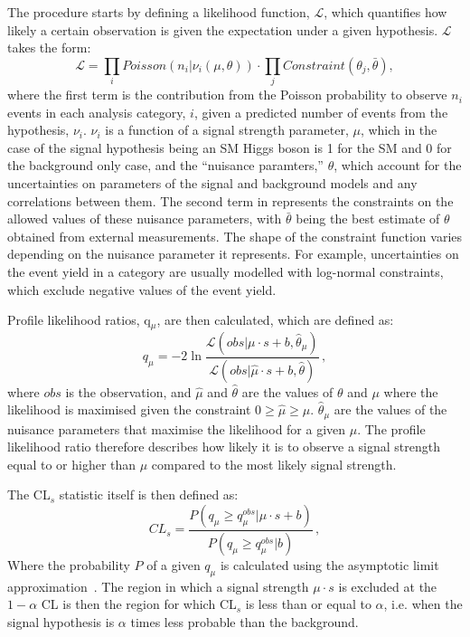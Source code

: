 The procedure starts by defining a likelihood function, $\mathcal{L}$, which quantifies how likely a certain observation is given the expectation under a given hypothesis. $\mathcal{L}$ takes the form:
\begin{equation}
  \label{eq:likelihood}
  \mathcal{L}=\displaystyle\prod_{i}Poisson\left(n_{i}|\nu_{i}\left(\mu,\theta\right)\right)\cdot\prod_{j}Constraint\left(\theta_{j},\bar{\theta}\right),
\end{equation}
where the first term is the contribution from the Poisson probability to observe $n_{i}$ events in each analysis category, $i$, given a predicted number of events from the hypothesis, $\nu_{i}$. $\nu_{i}$ is a function of a signal strength parameter, $\mu$, which in the case of the signal hypothesis being an SM Higgs boson is 1 for the SM and 0 for the background only case, and the ``nuisance paramters,'' $\theta$, which account for the uncertainties on parameters of the signal and background models and any correlations between them. The second term in  represents the constraints on the allowed values of these nuisance parameters, with $\bar{\theta}$ being the best estimate of $\theta$ obtained from external measurements. The shape of the constraint function varies depending on the nuisance parameter it represents. For example, uncertainties on the event yield in a category are usually modelled with log-normal constraints, which exclude negative values of the event yield. 

Profile likelihood ratios, q$_{\mu}$, are then calculated, which are defined as:
\begin{equation}
  \label{eq:proflikelihood}
  q_{\mu} = -2 \ln\frac{\mathcal{L}(obs|\mu \cdot s + b,\hat{\theta}_{\mu})}{\mathcal{L}(obs|\hat{\mu} \cdot s + b,\hat{\theta})}\,,
\end{equation}
where $obs$ is the observation, and $\hat{\mu}$ and $\hat{\theta}$ are the values of $\theta$ and $\mu$ where the likelihood is maximised given the constraint $0 \geqslant \hat{\mu} \geqslant \mu$. $\hat{\theta}_{\mu}$ are the values of the nuisance parameters that maximise the likelihood for a given $\mu$. The profile likelihood ratio therefore describes how likely it is to observe a signal strength equal to or higher than $\mu$ compared to the most likely signal strength.

The CL$_{s}$ statistic itself is then defined as:
\begin{equation}
  \label{eq:cls}
  CL_{s} = \frac{P(q_{\mu}\geqslant q_{\mu}^{obs} | \mu \cdot s + b)}{P(q_{\mu}\geqslant q_{\mu}^{obs}|b)}\,,
\end{equation}
Where the probability $P$ of a given $q_{\mu}$ is calculated using the asymptotic limit approximation~\cite{Cowan:2010js}. The region in which a signal strength $\mu \cdot s$ is excluded at the $1 - \alpha$ \ac{CL} is then the region for which CL$_{s}$ is less than or equal to $\alpha$, i.e. when the signal hypothesis is $\alpha$ times less probable than the background.
